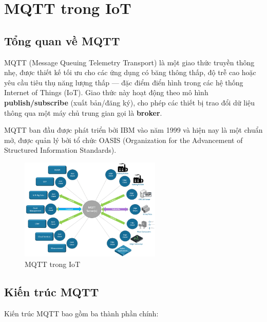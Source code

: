 \section{MQTT trong IoT}

\subsection{Tổng quan về MQTT}

MQTT (Message Queuing Telemetry Transport) là một giao thức truyền thông nhẹ, được thiết kế tối ưu cho các ứng dụng có băng thông thấp, độ trễ cao hoặc yêu cầu tiêu thụ năng lượng thấp — đặc điểm điển hình trong các hệ thống Internet of Things (IoT). Giao thức này hoạt động theo mô hình \textbf{publish/subscribe} (xuất bản/đăng ký), cho phép các thiết bị trao đổi dữ liệu thông qua một máy chủ trung gian gọi là \textbf{broker}.

MQTT ban đầu được phát triển bởi IBM vào năm 1999 và hiện nay là một chuẩn mở, được quản lý bởi tổ chức OASIS (Organization for the Advancement of Structured Information Standards).
\begin{figure}[H]
  \centering
  \includegraphics[width=0.6\textwidth]{Images/MQTT-trong-IoT.png}
  \caption{MQTT trong IoT}
\end{figure}
\subsection{Kiến trúc MQTT}

Kiến trúc MQTT bao gồm ba thành phần chính:

